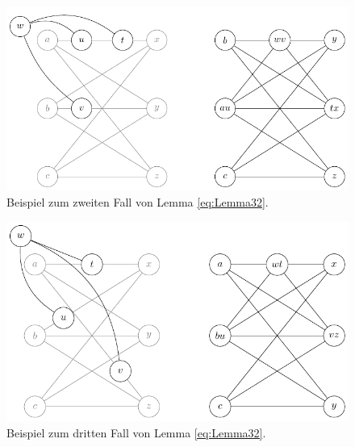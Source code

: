 \begin{figure}[H]
  \centering
  \includegraphics[keepaspectratio]{bilder/Lemma322.pdf}
  \caption{Beispiel zum zweiten Fall von Lemma \ref{eq:Lemma32}.}
  \label{fig:Lemma322}
\end{figure}
\begin{figure}[H]
  \centering
  \includegraphics[keepaspectratio]{bilder/Lemma323.pdf}
  \caption{Beispiel zum dritten Fall von Lemma \ref{eq:Lemma32}.}
  \label{fig:Lemma323}
\end{figure}

